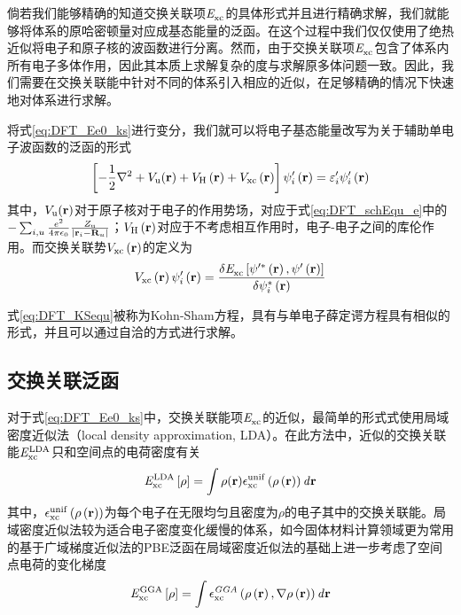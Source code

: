 倘若我们能够精确的知道交换关联项$\it E_{\rm xc}^{\rm } \it$的具体形式并且进行精确求解，我们就能够将体系的原哈密顿量对应成基态能量的泛函。在这个过程中我们仅仅使用了绝热近似将电子和原子核的波函数进行分离。然而，由于交换关联项$\it E_{\rm xc}^{\rm } \it$包含了体系内所有电子多体作用，因此其本质上求解复杂的度与求解原多体问题一致。因此，我们需要在交换关联能中针对不同的体系引入相应的近似，在足够精确的情况下快速地对体系进行求解。

将式\ref{eq:DFT_Ee0_ks}进行变分，我们就可以将电子基态能量改写为关于辅助单电子波函数的泛函的形式\chinesecolon
\begin{equation}
    \label{eq:DFT_KSequ}
    \left[-\frac{1}{2}\nabla^2+V_{\rm u}({\mathbf r})+V_{\rm H}\left({\mathbf r}\right)+V_{\rm xc}\left({\mathbf r}\right)\right]\psi'_i\left({\mathbf r}\right)=\varepsilon'_i\psi'_i\left({\mathbf r}\right) 
\end{equation}
其中，$V_{\rm u}({\mathbf r})$对于原子核对于电子的作用势场，对应于式\ref{eq:DFT_schEqu_e}中的$-\sum_{i,u}\frac{e^2}{4\pi\epsilon_0}\frac{Z_{\rm u}}{\left\lvert{\mathbf r}_i - {\mathbf R}_u\right\rvert}$；$V_{\rm H}\left({\mathbf r}\right)$对应于不考虑相互作用时，电子-电子之间的库伦作用。而交换关联势$V_{\rm xc}\left({\mathbf r}\right)$的定义为\chinesecolon
\[
    V_{\rm xc}\left({\mathbf r}\right)\psi'_i\left({\mathbf r}\right)=\frac{\delta \it E_{\rm xc}^{\rm } \it\left[\psi'^*\left({\mathbf r}\right),\psi'\left({\mathbf r}\right)\right]}{\delta \psi_i^*\left({\mathbf r}\right)}
\]

式\ref{eq:DFT_KSequ}被称为Kohn-Sham方程，具有与单电子薛定谔方程具有相似的形式，并且可以通过自洽的方式进行求解。

\subsection{交换关联泛函}

对于式\ref{eq:DFT_Ee0_ks}中，交换关联能项$\it E_{\rm xc}^{\rm } \it$的近似，最简单的形式式使用局域密度近似法（local density approximation, LDA）。在此方法中，近似的交换关联能$\it E_{\rm xc}^{\rm LDA} \it$只和空间点的电荷密度有关\chinesecolon
\begin{equation}
    \label{eq:DFT_LDA}
    \it E_{\rm xc}^{\rm LDA} \it\left[\rho\right]=\int \rho({\mathbf r}) \epsilon_{\rm xc}^{\rm unif} \left(\rho\left({\mathbf r}\right)\right) d{\mathbf r}
\end{equation}
其中，$\epsilon_{\rm xc}^{\rm unif}\left(\rho\left({\mathbf r}\right)\right)$为每个电子在无限均匀且密度为$\rho$的电子其中的交换关联能。局域密度近似法较为适合电子密度变化缓慢的体系，如今固体材料计算领域更为常用的基于广域梯度近似法的PBE泛函在局域密度近似法的基础上进一步考虑了空间点电荷的变化梯度\chinesecolon
\begin{equation}
    \it E_{\rm xc}^{\rm GGA} \it\left[\rho\right]=\int\epsilon_{\rm xc}^{GGA}\left(\rho\left({\mathbf r}\right),\nabla\rho\left({\mathbf r}\right)\right)d{\mathbf r}
\end{equation}

